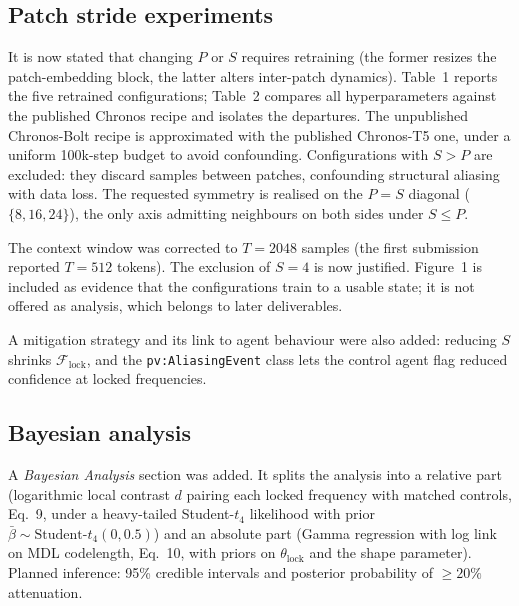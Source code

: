 \documentclass[
	letterpaper, %
	10pt, %
	unnumberedsections, %
	twoside, %
]{LTJournalArticle}
\begin{document}
\subsection{Patch stride experiments}
It is now stated that changing $P$ or $S$ requires retraining (the former resizes the patch-embedding block, the latter alters inter-patch dynamics). Table~1 reports the five retrained configurations; Table~2 compares all hyperparameters against the published Chronos recipe and isolates the departures. The unpublished Chronos-Bolt recipe is approximated with the published Chronos-T5 one, under a uniform 100k-step budget to avoid confounding. Configurations with $S > P$ are excluded: they discard samples between patches, confounding structural aliasing with data loss. The requested symmetry is realised on the $P=S$ diagonal ($\{8,16,24\}$), the only axis admitting neighbours on both sides under $S\le P$.
 
The context window was corrected to $T = 2048$ samples (the first submission reported $T = 512$ tokens). The exclusion of $S = 4$ is now justified. Figure~1 is included as evidence that the configurations train to a usable state; it is not offered as analysis, which belongs to later deliverables.

A mitigation strategy and its link to agent behaviour were also added: reducing $S$ shrinks $\mathcal{F}_{\mathrm{lock}}$, and the \texttt{pv:AliasingEvent} class lets the control agent flag reduced confidence at locked frequencies.
 
\subsection{Bayesian analysis}
A \emph{Bayesian Analysis} section was added. It splits the analysis into a relative part (logarithmic local contrast $d$ pairing each locked frequency with matched controls, Eq.~9, under a heavy-tailed Student-$t_4$ likelihood with prior $\bar\beta \sim \text{Student-}t_4(0,0.5)$) and an absolute part (Gamma regression with log link on MDL codelength, Eq.~10, with priors on $\theta_{\text{lock}}$ and the shape parameter). Planned inference: 95\% credible intervals and posterior probability of ${\ge}20\%$ attenuation.
\end{document}
